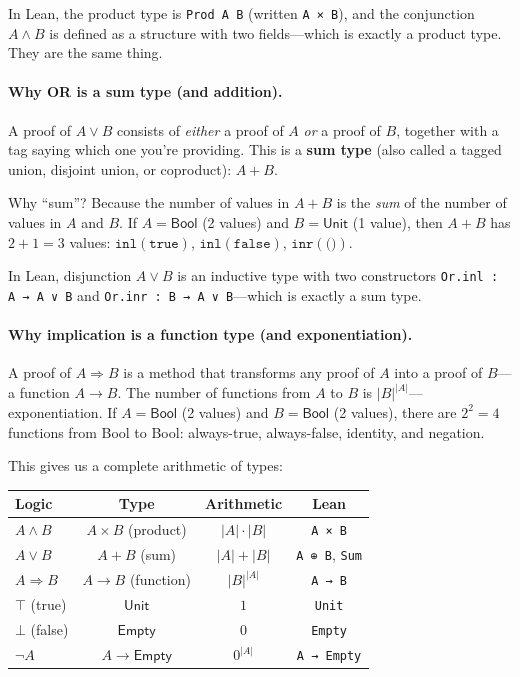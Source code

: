\documentclass[11pt,a4paper]{article}
\theoremstyle{definition}
\begin{document}
In Lean, the product type is \texttt{Prod A B} (written \texttt{A × B}), and
the conjunction $A \land B$ is defined as a structure with two fields---which
is exactly a product type. They are the same thing.

\paragraph{Why OR is a sum type (and addition).}
A proof of $A \lor B$ consists of \emph{either} a proof of $A$ \emph{or} a
proof of $B$, together with a tag saying which one you're providing. This is
a \textbf{sum type} (also called a tagged union, disjoint union, or coproduct):
$A + B$.

Why ``sum''? Because the number of values in $A + B$ is the \emph{sum} of the
number of values in $A$ and $B$. If $A = \textsf{Bool}$ (2 values) and
$B = \textsf{Unit}$ (1 value), then $A + B$ has $2 + 1 = 3$ values:
$\texttt{inl}(\texttt{true})$, $\texttt{inl}(\texttt{false})$,
$\texttt{inr}(\texttt{()})$.

In Lean, disjunction $A \lor B$ is an inductive type with two constructors
\texttt{Or.inl : A → A ∨ B} and \texttt{Or.inr : B → A ∨ B}---which is
exactly a sum type.

\paragraph{Why implication is a function type (and exponentiation).}
A proof of $A \Rightarrow B$ is a method that transforms any proof of $A$
into a proof of $B$---a function $A \to B$. The number of functions from $A$
to $B$ is $|B|^{|A|}$---exponentiation. If $A = \textsf{Bool}$ (2 values) and
$B = \textsf{Bool}$ (2 values), there are $2^2 = 4$ functions from
\textsf{Bool} to \textsf{Bool}: always-true, always-false, identity, and
negation.

This gives us a complete arithmetic of types:
\begin{center}
\renewcommand{\arraystretch}{1.4}
\begin{tabular}{lccc}
\textbf{Logic} & \textbf{Type} & \textbf{Arithmetic} & \textbf{Lean} \\
\hline
$A \land B$ & $A \times B$ (product) & $|A| \cdot |B|$ & \texttt{A × B} \\
$A \lor B$ & $A + B$ (sum) & $|A| + |B|$ & \texttt{A ⊕ B}, \texttt{Sum} \\
$A \Rightarrow B$ & $A \to B$ (function) & $|B|^{|A|}$ & \texttt{A → B} \\
$\top$ (true) & $\textsf{Unit}$ & $1$ & \texttt{Unit} \\
$\bot$ (false) & $\textsf{Empty}$ & $0$ & \texttt{Empty} \\
$\lnot A$ & $A \to \textsf{Empty}$ & $0^{|A|}$ & \texttt{A → Empty} \\
\end{tabular}
\end{center}
\end{document}
